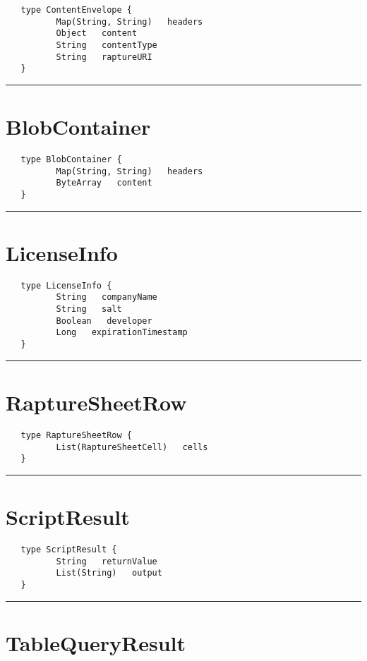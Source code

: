 \begin{verbatim}
   type ContentEnvelope {
          Map(String, String)   headers
          Object   content
          String   contentType
          String   raptureURI
   }
\end{verbatim}

\rule{15cm}{2pt}
\section{BlobContainer}
\label{type:BlobContainer}

\begin{verbatim}
   type BlobContainer {
          Map(String, String)   headers
          ByteArray   content
   }
\end{verbatim}

\rule{15cm}{2pt}
\section{LicenseInfo}
\label{type:LicenseInfo}

\begin{verbatim}
   type LicenseInfo {
          String   companyName
          String   salt
          Boolean   developer
          Long   expirationTimestamp
   }
\end{verbatim}

\rule{15cm}{2pt}
\section{RaptureSheetRow}
\label{type:RaptureSheetRow}

\begin{verbatim}
   type RaptureSheetRow {
          List(RaptureSheetCell)   cells
   }
\end{verbatim}

\rule{15cm}{2pt}
\section{ScriptResult}
\label{type:ScriptResult}

\begin{verbatim}
   type ScriptResult {
          String   returnValue
          List(String)   output
   }
\end{verbatim}

\rule{15cm}{2pt}
\section{TableQueryResult}
\label{type:TableQueryResult}

